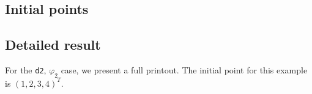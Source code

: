 \documentclass[12pt, a4paper]{article}
\begin{document}
\subsection{Initial points}



\subsection{Detailed result}

For the \texttt{d2}, $\varphi_2$ case, we present a full printout. The initial point for this example is ${(1,2,3,4)}^T$.
\end{document}
